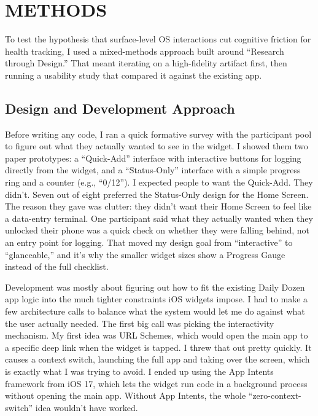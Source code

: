 \documentclass[10pt,twocolumn]{article}
\begin{document}
\section{METHODS}

To test the hypothesis that surface-level OS interactions cut cognitive friction for health tracking, I used a mixed-methods approach built around ``Research through Design.'' That meant iterating on a high-fidelity artifact first, then running a usability study that compared it against the existing app.

\subsection{Design and Development Approach}

Before writing any code, I ran a quick formative survey with the participant pool to figure out what they actually wanted to see in the widget. I showed them two paper prototypes: a ``Quick-Add'' interface with interactive buttons for logging directly from the widget, and a ``Status-Only'' interface with a simple progress ring and a counter (e.g., ``0/12''). I expected people to want the Quick-Add. They didn't. Seven out of eight preferred the Status-Only design for the Home Screen. The reason they gave was clutter: they didn't want their Home Screen to feel like a data-entry terminal. One participant said what they actually wanted when they unlocked their phone was a quick check on whether they were falling behind, not an entry point for logging. That moved my design goal from ``interactive'' to ``glanceable,'' and it's why the smaller widget sizes show a Progress Gauge instead of the full checklist.

Development was mostly about figuring out how to fit the existing Daily Dozen app logic into the much tighter constraints iOS widgets impose.\cite{AppleHIGWidgets} I had to make a few architecture calls to balance what the system would let me do against what the user actually needed. The first big call was picking the interactivity mechanism. My first idea was URL Schemes, which would open the main app to a specific deep link when the widget is tapped. I threw that out pretty quickly. It causes a context switch, launching the full app and taking over the screen, which is exactly what I was trying to avoid. I ended up using the App Intents framework from iOS 17,\cite{AppleHIGWidgets} which lets the widget run code in a background process without opening the main app. Without App Intents, the whole ``zero-context-switch'' idea wouldn't have worked.
\end{document}

